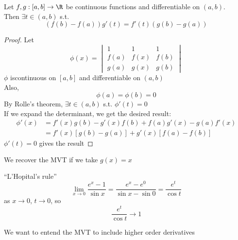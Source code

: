 \begin{theorem}
Let $f,g: [a,b] \to \R$ be continuous functions and differentiable on $(a,b)$.\\
Then $\exists t\in (a,b)$ s.t.
\[(f(b) - f(a))g'(t) = f'(t)(g(b)-g(a))\]
\begin{proof}
Let
\[\phi(x) = \begin{vmatrix}1&1&1\\f(a)&f(x)&f(b)\\g(a)&g(x)&g(b)\end{vmatrix}\]
$\phi$ iscontinuous on $[a,b]$ and differentiable on $(a,b)$\\
Also,
\[\phi(a) = \phi(b) = 0\]
By Rolle's theorem, $\exists t \in (a,b)$ s.t. $\phi'(t) = 0$\\
If we expand the determinant, we get the desired result:
\begin{align*}
    \phi'(x) &= f'(x)g(b) - g'(x)f(b) + f(a)g'(x)-g(a)f'(x)\\
    &= f'(x)[g(b)-g(a)] + g'(x)[f(a) - f(b)]
\end{align*}
$\phi'(t) = 0$ gives the result
\end{proof}
\begin{note}
We recover the MVT if we take $g(x) = x$
\end{note}
\end{theorem}
\begin{example}
``L'Hopital's rule''
\[\lim_{x\to 0}\frac{e^x-1}{\sin x}  = \frac{e^x-e^0}{\sin x - \sin 0}= \frac{e^t}{\cos t}\]
as $x\to 0$, $t\to 0$, so
\[\frac{e^t}{\cos t} \to 1\]
\end{example}
\begin{note}
We want to entend the MVT to include higher order derivatives
\end{note}
